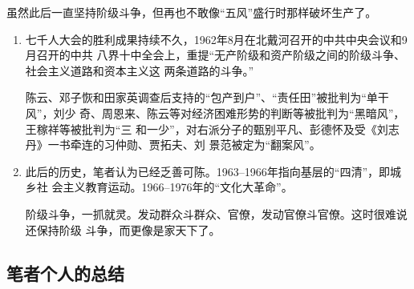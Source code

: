 虽然此后一直坚持阶级斗争，但再也不敢像``五风''盛行时那样破坏生产了。

\begin{enumerate}
\item 七千人大会的胜利成果持续不久，1962年8月在北戴河召开的中共中央会议和9月召开的中共
八界十中全会上，重提``无产阶级和资产阶级之间的阶级斗争、社会主义道路和资本主义这
两条道路的斗争。''

陈云、邓子恢和田家英调查后支持的``包产到户''、``责任田''被批判为``单干风''，刘少
奇、周恩来、陈云等对经济困难形势的判断等被批判为``黑暗风''，王稼祥等被批判为``三
和一少''，对右派分子的甄别平凡、彭德怀及受《刘志丹》一书牵连的习仲勋、贾拓夫、刘
景范被定为``翻案风''。

\item 此后的历史，笔者认为已经乏善可陈。1963--1966年指向基层的``四清''，即城乡社
  会主义教育运动。1966--1976年的``文化大革命''。

  阶级斗争，一抓就灵。发动群众斗群众、官僚，发动官僚斗官僚。这时很难说还保持阶级
  斗争，而更像是家天下了。
\end{enumerate}

\subsection{笔者个人的总结}

